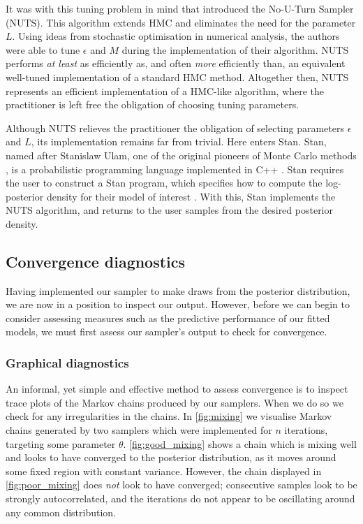 It was with this tuning problem in mind that \textcite{hoffman14} introduced
the No-U-Turn Sampler (NUTS). This algorithm extends HMC and eliminates the
need for the parameter $L$. Using ideas from stochastic optimisation in
numerical analysis, the authors were able to tune $\epsilon$ and $M$ during the
implementation of their algorithm. NUTS performs \emph{at least} as efficiently
as, and often \emph{more} efficiently than, an equivalent well-tuned
implementation of a standard HMC method. Altogether then, NUTS represents an
efficient implementation of a HMC-like algorithm, where the practitioner is
left free the obligation of choosing tuning parameters. 

Although NUTS relieves the practitioner the obligation of selecting parameters
$\epsilon$ and $L$, its implementation remains far from trivial. Here enters
Stan. Stan, named after Stanislaw Ulam, one of the original pioneers of Monte
Carlo methods \parencite{metropolis49}, is a probabilistic programming language
implemented in C++ \parencite{gelman15}. Stan requires the user to construct a
Stan program, which specifies how to compute the log-posterior density for
their model of interest \parencite{stanteam15}. With this, Stan implements the
NUTS algorithm, and returns to the user samples from the desired posterior
density.

\subsection{Convergence diagnostics}
\label{ssec:convergence_diagnostics}

Having implemented our sampler to make draws from the posterior distribution,
we are now in a position to inspect our output. However, before we can begin to
consider assessing measures such as the  predictive performance of our fitted
models, we must first assess our sampler's output to check for convergence.

\subsubsection{Graphical diagnostics}

An informal, yet simple and effective method to assess convergence is to
inspect trace plots of the Markov chains produced by our samplers. When we do
so we check for any irregularities in the chains. In \cref{fig:mixing} we
visualise Markov chains generated by two samplers which were implemented for
$n$ iterations, targeting some parameter $\theta$. \cref{fig:good_mixing} shows
a chain which is mixing well and looks to have converged to the posterior
distribution, as it moves around some fixed region with constant variance.
However, the chain displayed in \cref{fig:poor_mixing} does \emph{not} look to
have converged; consecutive samples look to be strongly autocorrelated, and the
iterations do not appear to be oscillating around any common distribution.

